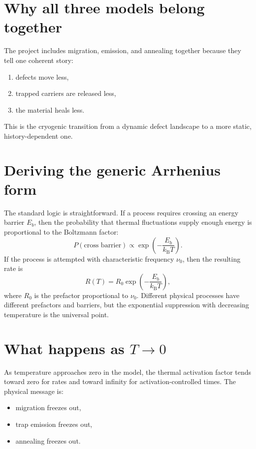 \documentclass[11pt]{article}
\newcommand{\kb}{k_\mathrm{B}}
\begin{document}
\section{Why all three models belong together}
The project includes migration, emission, and annealing together because they tell one coherent story:
\begin{enumerate}[label=\arabic*.]
    \item defects move less,
    \item trapped carriers are released less,
    \item the material heals less.
\end{enumerate}

This is the cryogenic transition from a dynamic defect landscape to a more static, history-dependent one.

\section{Deriving the generic Arrhenius form}
The standard logic is straightforward. If a process requires crossing an energy barrier $E_b$, then the probability that thermal fluctuations supply enough energy is proportional to the Boltzmann factor:
\begin{equation}
P(\text{cross barrier}) \propto \exp\!\left(-\frac{E_b}{\kb T}\right).
\end{equation}
If the process is attempted with characteristic frequency $\nu_0$, then the resulting rate is
\begin{equation}
R(T) = R_0 \exp\!\left(-\frac{E_b}{\kb T}\right),
\end{equation}
where $R_0$ is the prefactor proportional to $\nu_0$. Different physical processes have different prefactors and barriers, but the exponential suppression with decreasing temperature is the universal point.

\section{What happens as $T \to 0$}
As temperature approaches zero in the model, the thermal activation factor tends toward zero for rates and toward infinity for activation-controlled times. The physical message is:
\begin{itemize}
    \item migration freezes out,
    \item trap emission freezes out,
    \item annealing freezes out.
\end{itemize}
\end{document}
